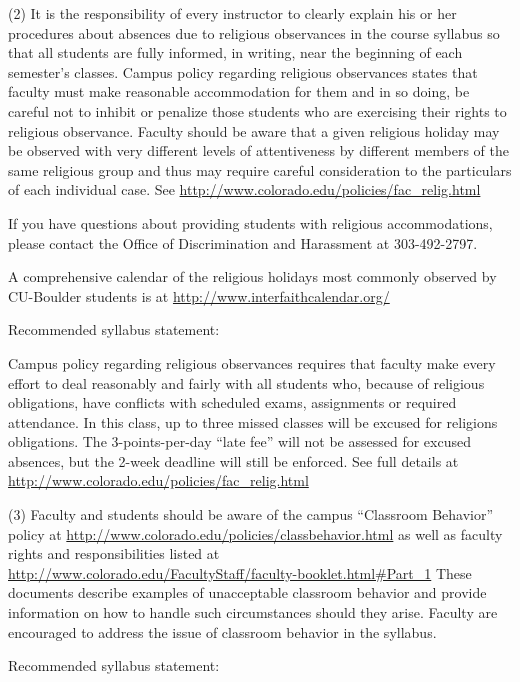 \documentclass[]{article}
\begin{document}
(2) It is the responsibility of every instructor to clearly explain his or her
procedures about absences due to religious observances in the course syllabus
so that all students are fully informed, in writing, near the beginning of each
semester's classes.  Campus policy regarding religious observances states
that faculty must make reasonable accommodation for them and in so doing, be
careful not to inhibit or penalize those students who are exercising their
rights to religious observance. Faculty should be aware that a given religious
holiday may be observed with very different levels of attentiveness by
different members of the same religious group and thus may require careful
consideration to the particulars of each individual case.  See
\url{http://www.colorado.edu/policies/fac_relig.html}

If you have questions about providing students with religious accommodations,
please contact the Office of Discrimination and Harassment at 303-492-2797.

A comprehensive calendar of the religious holidays most commonly observed by
CU-Boulder students is at \url{http://www.interfaithcalendar.org/}

Recommended syllabus statement:

Campus policy regarding religious observances requires that faculty make every
effort to deal reasonably and fairly with all students who, because of
religious obligations, have conflicts with scheduled exams, assignments or
required attendance.  In this class, up to three missed classes will be excused
for religions obligations.  The 3-points-per-day “late fee” will not be assessed
for excused absences, but the 2-week deadline will still be enforced.
See full details at \url{http://www.colorado.edu/policies/fac_relig.html}

(3)  Faculty and students should be aware of the campus “Classroom
Behavior” policy at
\url{http://www.colorado.edu/policies/classbehavior.html} as well as faculty rights
and responsibilities listed at
\url{http://www.colorado.edu/FacultyStaff/faculty-booklet.html#Part_1}
These documents describe examples of unacceptable classroom behavior and
provide information on how to handle such circumstances should they arise.
Faculty are encouraged to address the issue of classroom behavior in the
syllabus.

Recommended syllabus statement:
\end{document}
